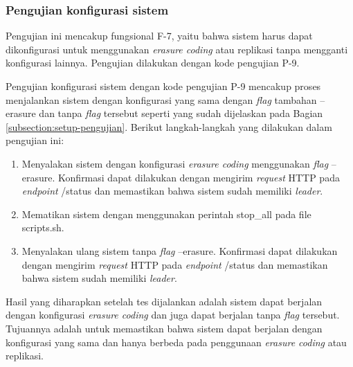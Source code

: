 \subsubsection{Pengujian konfigurasi sistem}
\label{subsubsection:pengujian-konfigurasi-sistem}

Pengujian ini mencakup fungsional F-7, yaitu bahwa sistem harus dapat dikonfigurasi untuk menggunakan \textit{erasure coding} atau replikasi tanpa mengganti konfigurasi lainnya. Pengujian dilakukan dengan kode pengujian P-9. 

Pengujian konfigurasi sistem dengan kode pengujian P-9 mencakup proses menjalankan sistem dengan konfigurasi yang sama dengan \textit{flag} tambahan --erasure dan tanpa \textit{flag} tersebut seperti yang sudah dijelaskan pada Bagian \ref{subsection:setup-pengujian}. Berikut langkah-langkah yang dilakukan dalam pengujian ini:

\begin{enumerate}
  \item Menyalakan sistem dengan konfigurasi \textit{erasure coding} menggunakan \textit{flag} --erasure. Konfirmasi dapat dilakukan dengan mengirim \textit{request} HTTP pada \textit{endpoint} /status dan memastikan bahwa sistem sudah memiliki \textit{leader}.
  \item Mematikan sistem dengan menggunakan perintah stop\_all pada file scripts.sh.
  \item Menyalakan ulang sistem tanpa \textit{flag} --erasure. Konfirmasi dapat dilakukan dengan mengirim \textit{request} HTTP pada \textit{endpoint} /status dan memastikan bahwa sistem sudah memiliki \textit{leader}.
\end{enumerate}

Hasil yang diharapkan setelah tes dijalankan adalah sistem dapat berjalan dengan konfigurasi \textit{erasure coding} dan juga dapat berjalan tanpa \textit{flag} tersebut. Tujuannya adalah untuk memastikan bahwa sistem dapat berjalan dengan konfigurasi yang sama dan hanya berbeda pada penggunaan \textit{erasure coding} atau replikasi.
